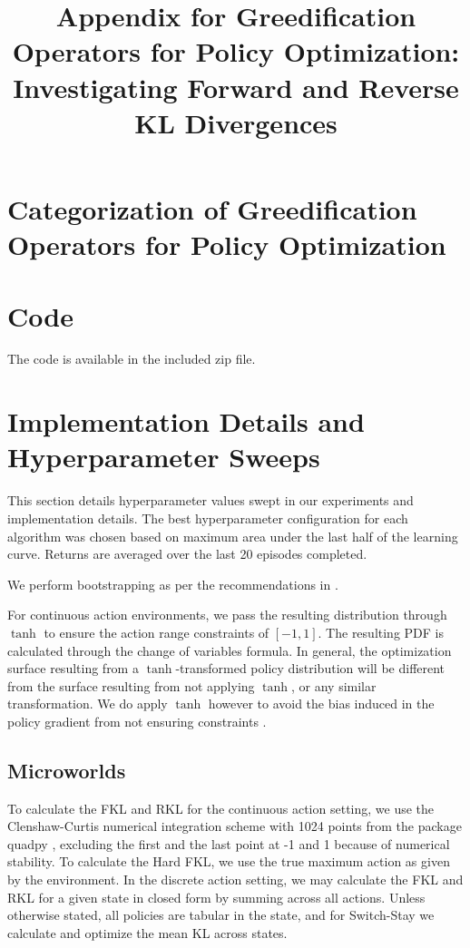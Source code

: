 \documentclass{article}
\title{Appendix for Greedification Operators for Policy Optimization: Investigating Forward and Reverse KL Divergences}
\date{}
\begin{document}
\maketitle
\appendix
\section{Categorization of Greedification Operators for Policy Optimization}\label{sec:api}


\section{Code}
The code is available in the included zip file. 


\section{Implementation Details and Hyperparameter Sweeps}\label{sec:experimental-details}
This section details hyperparameter values swept in our experiments and implementation details. The best hyperparameter configuration for each algorithm was chosen based on maximum area under the last half of the learning curve. Returns are averaged over the last 20 episodes completed. 

We perform bootstrapping as per the recommendations in \citet{pardo2017time}.

For continuous action environments, we pass the resulting distribution through $\tanh$ to ensure the action range constraints of $[-1, 1]$. The resulting PDF is calculated through the change of variables formula. In general, the optimization surface resulting from a $\tanh$-transformed policy distribution will be different from the surface resulting from not applying $\tanh$, or any similar transformation. We do apply $\tanh$ however to avoid the bias induced in the policy gradient from not ensuring constraints \citep{chou2017improving}.

\subsection{Microworlds} 
To calculate the FKL and RKL for the continuous action setting, we use the Clenshaw-Curtis \citep{clenshaw1960method} numerical integration scheme with 1024 points from the package quadpy \citep{schlomerquadpy}, excluding the first and the last point at -1 and 1 because of numerical stability. 
To calculate the Hard FKL, we use the true maximum action as given by the environment. In the discrete action setting, we may calculate the FKL and RKL for a given state in closed form by summing across all actions. Unless otherwise stated, all policies are tabular in the state, and for Switch-Stay we calculate and optimize the mean KL across states. 
\end{document}
